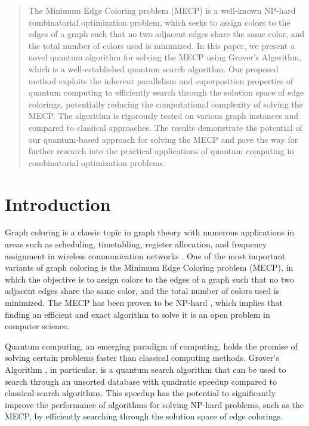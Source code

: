 \begin{abstract}
The Minimum Edge Coloring problem (MECP) is a well-known NP-hard combinatorial optimization problem, which seeks to assign colors to the edges of a graph such that no two adjacent edges share the same color, and the total number of colors used is minimized. In this paper, we present a novel quantum algorithm for solving the MECP using Grover's Algorithm, which is a well-established quantum search algorithm. Our proposed method exploits the inherent parallelism and superposition properties of quantum computing to efficiently search through the solution space of edge colorings, potentially reducing the computational complexity of solving the MECP. The algorithm is rigorously tested on various graph instances and compared to classical approaches. The results demonstrate the potential of our quantum-based approach for solving the MECP and pave the way for further research into the practical applications of quantum computing in combinatorial optimization problems.
\end{abstract}

\section{Introduction}

Graph coloring is a classic topic in graph theory with numerous applications in areas such as scheduling, timetabling, register allocation, and frequency assignment in wireless communication networks \cite{brelaz1979new,kubale2004graph,leighton1997multicoloring,robertson1994graph}. One of the most important variants of graph coloring is the Minimum Edge Coloring problem (MECP), in which the objective is to assign colors to the edges of a graph such that no two adjacent edges share the same color, and the total number of colors used is minimized. The MECP has been proven to be NP-hard \cite{holyer1981np}, which implies that finding an efficient and exact algorithm to solve it is an open problem in computer science.

Quantum computing, an emerging paradigm of computing, holds the promise of solving certain problems faster than classical computing methods. Grover's Algorithm \cite{grover1996fast}, in particular, is a quantum search algorithm that can be used to search through an unsorted database with quadratic speedup compared to classical search algorithms. This speedup has the potential to significantly improve the performance of algorithms for solving NP-hard problems, such as the MECP, by efficiently searching through the solution space of edge colorings.

